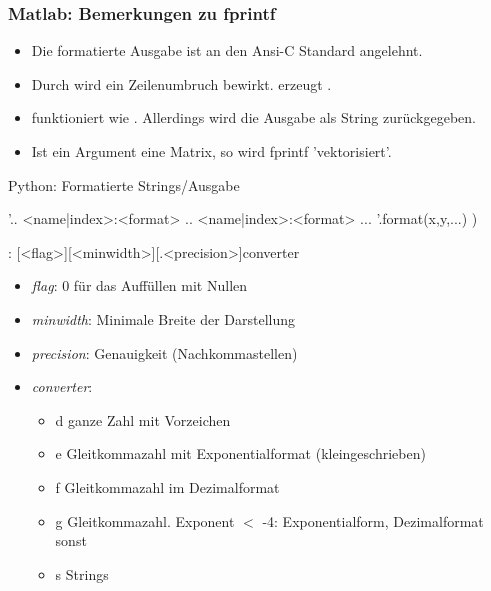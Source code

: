 \documentclass[hyperref={xetex}]{beamer}
\begin{document}
%
%
\begin{frame}[fragile]\frametitle{Matlab: Bemerkungen zu fprintf}
\begin{itemize} 
\item Die formatierte Ausgabe ist an den Ansi-C Standard angelehnt.
\item Durch  wird ein Zeilenumbruch bewirkt.  erzeugt
  \mcode{\%}.
 \item {} funktioniert wie . Allerdings wird
  die Ausgabe als String zurückgegeben. 
\item Ist ein Argument eine Matrix, so wird fprintf 'vektorisiert'.
\end{itemize}
\end{frame}

%
%
%
\begin{frame}[fragile]{Python: Formatierte Strings/Ausgabe}
  \begin{pyin}
'.. {<name|index>:<format>} .. {<name|index>:<format>} ... '.format(x,y,...) )
  \end{pyin}

  : [<flag>][<minwidth>][.<precision>]converter
  \begin{itemize}
    \item \emph{flag}: 0 für das Auffüllen mit Nullen
    \item \emph{minwidth}: Minimale Breite der Darstellung
    \item \emph{precision}: Genauigkeit (Nachkommastellen)
    \item \emph{converter}:
    \begin{itemize}
      \item \alert{d}   ganze Zahl mit Vorzeichen 
      \item \alert{e}  Gleitkommazahl mit Exponentialformat (kleingeschrieben) 
      \item \alert{f}   Gleitkommazahl im Dezimalformat 
      \item \alert{g}   Gleitkommazahl. Exponent $<$ -4: Exponentialform, Dezimalformat sonst
      \item \alert{s}   Strings  
    \end{itemize}
  \end{itemize}

\end{frame}
\end{document}
